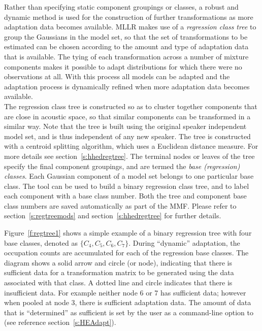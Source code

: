 Rather than specifying static component groupings or classes, a robust
and dynamic method is used for the construction of further transformations
as more adaptation data becomes available. MLLR makes
use of a \textit{regression class tree} to group the Gaussians in the
model set, so that the set of transformations to be estimated can be
chosen according to the amount and type of adaptation data that is
available. The tying of each transformation across a number of mixture
components makes it possible to adapt distributions for which there
were no observations at all. With this process all models can be
adapted and the adaptation process is dynamically refined when more
adaptation data becomes available.\\

The regression class tree 
is constructed so as to cluster
together components that are close in acoustic
space, so that similar components can be transformed in a similar way.
Note that the tree is built using the original speaker independent
model set, and is thus independent of any new speaker.
The tree is constructed with a centroid splitting algorithm, which uses 
a Euclidean distance measure. For more details see
section~\ref{s:hhedregtree}.
The terminal nodes or leaves of the tree specify the final component
groupings, and are termed the \textit{base
(regression) classes}. Each Gaussian component of a model set belongs 
to one particular base class. The tool  can
be used to build a binary regression class tree, and to label each
component with a base class number.  Both the tree and component base
class numbers are saved automatically as part of the MMF. Please refer to
section~\ref{s:regtreemods} and section~\ref{s:hhedregtree} for
further details.

Figure~\ref{f:regtree1} shows a simple example of a binary regression
tree with four base classes, denoted as $\{C_4, C_5, C_6,
C_7\}$. During ``dynamic'' adaptation, the
occupation counts are accumulated for each of the regression base
classes. The diagram shows a solid arrow and circle
(or node), indicating that there is sufficient data for a transformation
matrix to be generated using the data associated with that class. A
dotted line and circle indicates that there is insufficient
data. For example neither node 6 or 7 has sufficient data; however
when pooled at node 3, there is sufficient adaptation data.
 The amount of data that is ``determined'' as sufficient is set
by the user as a command-line option to  (see reference
section~\ref{s:HEAdapt}).

